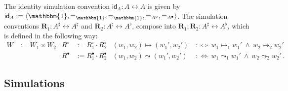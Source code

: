 \documentclass[acmsmall,screen,review,anonymous]{acmart}
\newcommand{\kw}[1]{\ensuremath{ \mathsf{#1} }}
\newcommand{\que}{\circ}
\newcommand{\ans}{\bullet}
\begin{document}
\begin{definition} \label{def:sccomp}
The identity simulation convention
$\kw{id}_A : A \leftrightarrow A$
is given by
$\kw{id}_A := \langle
    \mathbbm{1}, {=}_\mathbbm{1}, {=}_\mathbbm{1}, {=}_{A^\que}, {=}_{A^\ans}
 \rangle$.
The simulation conventions
$\mathbf{R}_1 : A^\sharp \leftrightarrow A^\natural$ and
$\mathbf{R}_2 : A^\natural \leftrightarrow A^\flat$,
compose into
$\mathbf{R}_1 \mathbin; \mathbf{R}_2 : A^\sharp \leftrightarrow A^\flat$,
which is defined in the following way:
\begin{align*}
  W &:= W_1 \times W_2 &
  R^\que &:= R_1^\que \cdot R_2^\que &
  (w_1, w_2) \mapsto (w_1', w_2') \: &:\Leftrightarrow \:
    w_1 \mapsto_1 w_1' \: \wedge \:
    w_2 \mapsto_2 w_2' \\
&&  R^\ans &:= R_1^\ans \cdot R_2^\ans &
  (w_1, w_2) \leadsto (w_1', w_2') \: &:\Leftrightarrow \:
    w_1 \leadsto_1 w_1' \: \wedge \:
    w_2 \leadsto_2 w_2'
  \,.
\end{align*}
\end{definition}


\subsection{Simulations} \label{sec:base:sim} %
\end{document}
